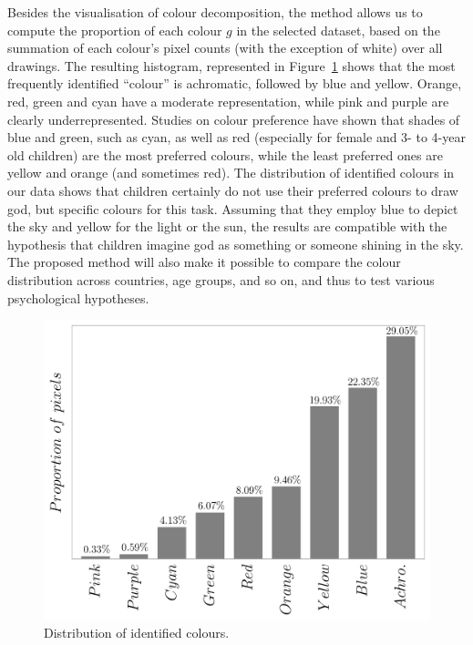 \documentclass[11pt,a4paper]{article}
\begin{document}


Besides the visualisation of colour decomposition, the method allows us to compute the proportion of each colour $g$ in the selected dataset, based on the summation of each colour's pixel counts (with the exception of white) over all drawings. The resulting histogram, represented in Figure~\ref{fig:propcolours} shows that the most frequently identified ``colour'' is achromatic, followed by blue and yellow. Orange, red, green and cyan have a moderate representation, while pink and purple are clearly underrepresented. Studies on colour preference \cite[see e.g.][]{Granger1955,Zentner2001,JonauskaiteMohrAntoniettiEtAl2016} have shown that shades of blue and green, such as cyan, as well as red (especially for female and 3- to 4-year old children) are the most preferred colours, while the least preferred ones are yellow and orange (and sometimes red). The distribution of identified colours in our data shows that children certainly do not use their preferred colours to draw god, but specific colours for this task. Assuming that they employ blue to depict the sky and yellow for the light or the sun, the results are compatible with the hypothesis that children imagine god as something or someone shining in the sky. The proposed method will also make it possible to compare the colour distribution across countries, age groups, and so on, and thus to test various psychological hypotheses.

\begin{figure}[h!]
	\centering
	\includegraphics[width=\linewidth]{figures/colors-barplot.png}
	\caption{Distribution of identified colours.}
	\label{fig:propcolours}
\end{figure}
\end{document}
